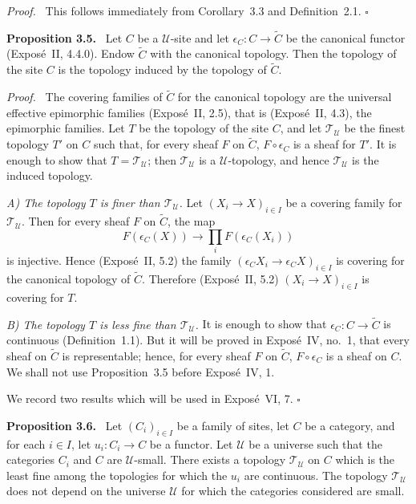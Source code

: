 \documentclass[11pt]{article}
\newcommand{\U}{\mathcal{U}}
\newcommand{\T}{\mathcal{T}}
\newcommand{\qedtext}{\hfill\(\square\)}
\newenvironment{statement}[1]{\par\medskip\noindent\textbf{#1.}\ }{\par\medskip}
\newenvironment{prooftext}{\par\noindent\emph{Proof.}\ }{\par\medskip}
\begin{document}
\begin{prooftext}
This follows immediately from Corollary~3.3 and Definition~2.1. \qedtext
\end{prooftext}

\begin{statement}{Proposition 3.5}
Let \(C\) be a \(\U\)-site and let \(\epsilon_C:C\to\widetilde C\) be the canonical functor (Expos\'e~II, 4.4.0). Endow \(\widetilde C\) with the canonical topology. Then the topology of the site \(C\) is the topology induced by the topology of \(\widetilde C\).
\end{statement}

\begin{prooftext}
The covering families of \(\widetilde C\) for the canonical topology are the universal effective epimorphic families (Expos\'e~II, 2.5), that is (Expos\'e~II, 4.3), the epimorphic families. Let \(T\) be the topology of the site \(C\), and let \(\T_{\U}\) be the finest topology \(T'\) on \(C\) such that, for every sheaf \(F\) on \(\widetilde C\), \(F\circ\epsilon_C\) is a sheaf for \(T'\). It is enough to show that \(T=\T_{\U}\); then \(\T_{\U}\) is a \(\U\)-topology, and hence \(\T_{\U}\) is the induced topology.

\emph{A) The topology \(T\) is finer than \(\T_{\U}\).} Let \((X_i\to X)_{i\in I}\) be a covering family for \(\T_{\U}\). Then for every sheaf \(F\) on \(\widetilde C\), the map
\[
F(\epsilon_C(X))\to\prod_iF(\epsilon_C(X_i))
\]
is injective. Hence (Expos\'e~II, 5.2) the family \((\epsilon_CX_i\to\epsilon_CX)_{i\in I}\) is covering for the canonical topology of \(\widetilde C\). Therefore (Expos\'e~II, 5.2) \((X_i\to X)_{i\in I}\) is covering for \(T\).

\emph{B) The topology \(T\) is less fine than \(\T_{\U}\).} It is enough to show that \(\epsilon_C:C\to\widetilde C\) is continuous (Definition~1.1). But it will be proved in Expos\'e~IV, no.~1, that every sheaf on \(\widetilde C\) is representable; hence, for every sheaf \(F\) on \(\widetilde C\), \(F\circ\epsilon_C\) is a sheaf on \(C\). We shall not use Proposition~3.5 before Expos\'e~IV, 1.

We record two results which will be used in Expos\'e~VI, 7. \qedtext
\end{prooftext}

\begin{statement}{Proposition 3.6}
Let \((C_i)_{i\in I}\) be a family of sites, let \(C\) be a category, and for each \(i\in I\), let \(u_i:C_i\to C\) be a functor. Let \(\U\) be a universe such that the categories \(C_i\) and \(C\) are \(\U\)-small. There exists a topology \(\T_{\U}\) on \(C\) which is the least fine among the topologies for which the \(u_i\) are continuous. The topology \(\T_{\U}\) does not depend on the universe \(\U\) for which the categories considered are small.
\end{statement}
\end{document}
